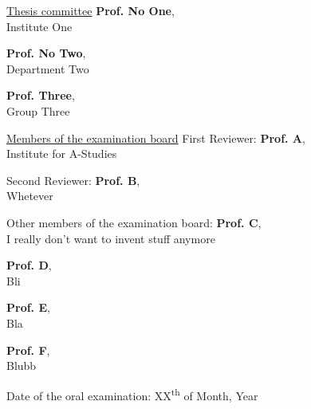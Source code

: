 
\maketitle

\cleardoublepage
\newpage \thispagestyle{empty}
\underline{Thesis committee}
\vskip 2.0mm
\textbf{Prof. No One}, \\
\small Institute One

\vskip 0.05cm
\normalsize \textbf{Prof. No Two}, \\
\small Department Two

\vskip 0.05cm
\normalsize \textbf{Prof. Three}, \\
\small Group Three

\vskip 4.0mm
\normalsize \underline{Members of the examination board}
\vskip 2.0mm
\normalsize First Reviewer: \textbf{Prof. A}, \\
\small Institute for A-Studies

\vskip 0.05cm
\normalsize Second Reviewer: \textbf{Prof. B}, \\
\small Whetever

\vskip 4.0mm
\normalsize Other members of the examination board:
\vskip 2.0mm
\normalsize \textbf{Prof. C}, \\
\small I really don't want to invent stuff anymore

\vskip 0.05cm
\normalsize \textbf{Prof. D}, \\
\small Bli

\vskip 0.05cm
\normalsize \textbf{Prof. E}, \\
\small Bla

\vskip 0.05cm
\normalsize \textbf{Prof. F}, \\
\small Blubb


\normalsize

\vfill
Date of the oral examination: \hfill XX\textsuperscript{th} of Month, Year

